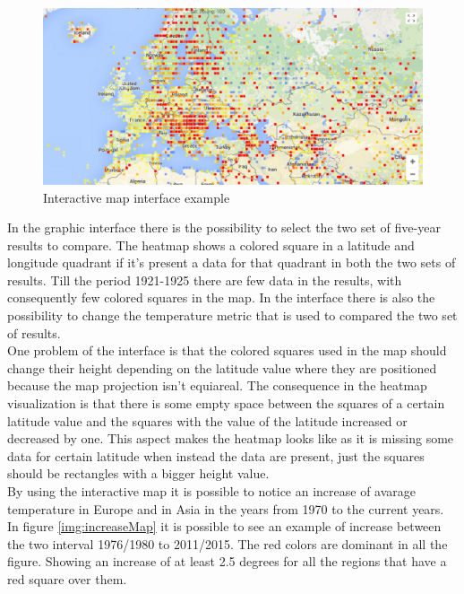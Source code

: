 \documentclass{vldb}
\begin{document}
\begin{figure}[tbh]
\includegraphics[width=1\linewidth]{interface}
\caption{Interactive map interface example}
\label{fig:interface}
\end{figure}

In the graphic interface there is the possibility to select the two set of five-year results to compare. The heatmap shows a colored square in a latitude and longitude quadrant if it's present a data for that quadrant in both the two sets of results. Till the period 1921-1925 there are few data in the results, with consequently few colored squares in the map. In the interface there is also the possibility to change the temperature metric that is used to compared the two set of results.\\
One problem of the interface is that the colored squares used in the map should change their height depending on the latitude value where they are positioned because the map projection isn't equiareal. The consequence in the heatmap visualization is that there is some empty space between the squares of a certain latitude value and the squares with the value of the latitude increased or decreased by one. This aspect makes the heatmap looks like as it is missing some data for certain latitude when instead the data are present, just the squares should be rectangles with a bigger height value.\\

By using the interactive map it is possible to notice an increase of avarage temperature in Europe and in Asia in the years from 1970 to the current years. In figure \ref{img:increaseMap} it is possible to see an example of increase between the two interval 1976/1980 to 2011/2015. The red colors are dominant in all the figure. Showing an increase of at least 2.5 degrees for all the regions that have a red square over them.
\end{document}
